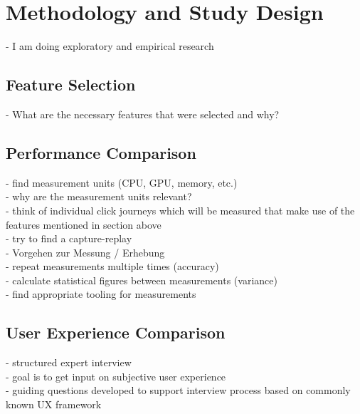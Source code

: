 \chapter{Methodology and Study Design}
- I am doing exploratory and empirical research

\section{Feature Selection} \label{section::feature_selection}
- What are the necessary features that were selected and why?

\section{Performance Comparison} \label{section::performance_comparison_design}
- find measurement units (CPU, GPU, memory, etc.)\\
- why are the measurement units relevant?\\
- think of individual click journeys which will be measured that make use of the features mentioned in section above\\
- try to find a capture-replay\\
- Vorgehen zur Messung / Erhebung\\
- repeat measurements multiple times (accuracy)\\
- calculate statistical figures between measurements (variance)\\
- find appropriate tooling for measurements\\


\section{User Experience Comparison}
- structured expert interview\\
- goal is to get input on subjective user experience\\
- guiding questions developed to support interview process based on commonly known UX framework\\
